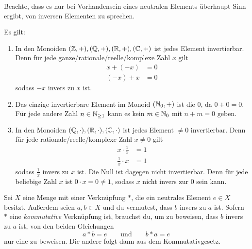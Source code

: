 \begin{bem}
    Beachte, dass es nur bei Vorhandensein eines neutralen Elements überhaupt Sinn ergibt, von inversen Elementen zu sprechen. 
\end{bem}


\begin{bsp} \label{bsp:inverse}
    Es gilt:
    \begin{enumerate}
        \item In den Monoiden $(\mathbb Z,+),(\mathbb Q,+),(\mathbb R,+),(\mathbb C,+)$ ist jedes Element invertierbar. Denn für jede ganze/rationale/reelle/komplexe Zahl $x$ gilt
        \begin{align*}
            x + (-x) & = 0 \\
            (-x) + x & = 0
        \end{align*}
        sodass $-x$ invers zu $x$ ist.
        \item Das einzige invertierbare Element im Monoid $(\mathbb N_0,+)$ ist die $0$, da $0+0=0$. Für jede andere Zahl $n\in \mathbb N_{\ge 1}$ kann es kein $m\in \mathbb N_0$ mit $n+m=0$ geben.
        \item In den Monoiden $(\mathbb Q,\cdot),(\mathbb R,\cdot),(\mathbb C,\cdot)$ ist jedes Element $\neq 0$ invertierbar. Denn für jede rationale/reelle/komplexe Zahl $x\neq 0$ gilt
        \begin{align*}
            x \cdot \frac{1}{x} & = 1 \\
            \frac{1}{x}\cdot x & = 1
        \end{align*}
        sodass $\frac{1}{x}$ invers zu $x$ ist. Die Null ist dagegen nicht invertierbar. Denn für jede beliebige Zahl $x$ ist $0\cdot x = 0\neq 1$, sodass $x$ nicht invers zur $0$ sein kann.
    \end{enumerate}
\end{bsp}

    
\begin{bem}
    Sei $X$ eine Menge mit einer Verknüpfung $*$, die ein neutrales Element $e\in X$ besitzt. Außerdem seien $a,b\in X$ und du vermutest, dass $b$ invers zu $a$ ist. Sofern $*$ eine \emph{kommutative} Verknüpfung ist, brauchst du, um zu beweisen, dass $b$ invers zu $a$ ist, von den beiden Gleichungen
        \[ a*b=e\qquad\text{und}\qquad b*a=e \]
    nur eine zu beweisen. Die andere folgt dann aus dem Kommutativgesetz.
\end{bem}


